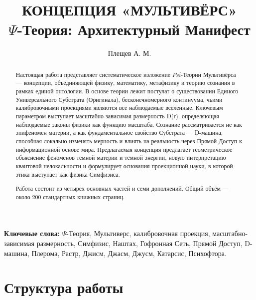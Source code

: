 \documentclass[a4paper,12pt]{article}
\begin{document}
\title{КОНЦЕПЦИЯ «МУЛЬТИВЁРС»\\[0.5em]\large $\Psi$-Теория: Архитектурный Манифест}
\author{Плещев А. М.}
\date{}
\maketitle

\begin{abstract}
	Настоящая работа представляет систематическое изложение $Psi$-Теории Мультивёрса — концепции, объединяющей физику, математику, метафизику и теорию сознания в рамках единой онтологии. В основе теории лежит постулат о существовании Единого Универсального Субстрата (Оригинала), бесконечномерного континуума, чьими калибровочными проекциями являются все наблюдаемые вселенные. Ключевым параметром выступает масштабно-зависимая размерность D(r), определяющая наблюдаемые законы физики как функцию масштаба. Сознание рассматривается не как эпифеномен материи, а как фундаментальное свойство Субстрата — D-машина, способная локально изменять мерность и влиять на реальность через Прямой Доступ к информационной основе мира. Предлагаемая концепция предлагает геометрическое объяснение феноменов тёмной материи и тёмной энергии, новую интерпретацию квантовой нелокальности и формулирует основания проекционной науки, в которой этика выступает как физика Симфизиса.
	
	Работа состоит из четырёх основных частей и семи дополнений. Общий объём — около 200 стандартных книжных страниц.
\end{abstract}

\vspace{1cm}
\noindent\textbf{Ключевые слова:} $\Psi$-Теория, Мультиверс, калибровочная проекция, масштабно-зависимая размерность, Симфизис, Наштах, Гофронная Сеть, Прямой Доступ, D-машина, Плерома, Растр, Джисм, Джасм, Джусм, Катарсис, Психофтора.

\newpage

\section*{Структура работы}
\end{document}
